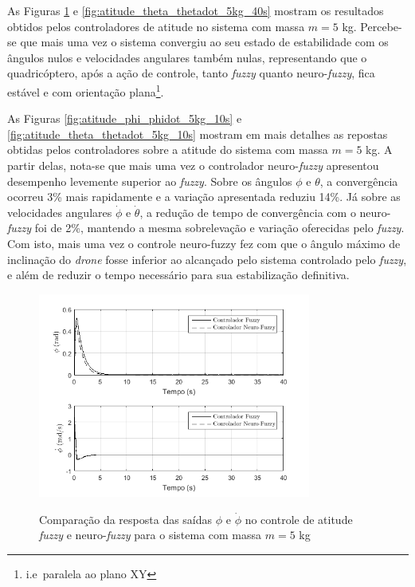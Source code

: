 
As Figuras \ref{fig:atitude_phi_phidot_5kg_40s} e \ref{fig:atitude_theta_thetadot_5kg_40s} mostram os resultados obtidos pelos controladores de atitude no sistema com massa $m=5$ kg. Percebe-se que mais uma vez o sistema convergiu ao seu estado de estabilidade com os ângulos nulos e velocidades angulares também nulas, representando que o quadricóptero, após a ação de controle, tanto \textit{fuzzy} quanto neuro-\textit{fuzzy}, fica estável e com orientação plana\footnote{i.e\ paralela ao plano XY}.

As Figuras \ref{fig:atitude_phi_phidot_5kg_10s} e \ref{fig:atitude_theta_thetadot_5kg_10s} mostram em mais detalhes as repostas obtidas pelos controladores sobre a atitude do sistema com massa $m=5$ kg. A partir delas, nota-se que mais uma vez o controlador neuro-\textit{fuzzy} apresentou desempenho levemente superior ao \textit{fuzzy}. Sobre os ângulos $\phi$ e $\theta$, a convergência ocorreu 3\% mais rapidamente e a variação apresentada reduziu 14\%. Já sobre as velocidades angulares $\dot{\phi}$ e $\dot{\theta}$, a redução de tempo de convergência com o neuro-\textit{fuzzy} foi de 2\%, mantendo a mesma sobrelevação e variação oferecidas pelo \textit{fuzzy}. Com isto, mais uma vez o controle neuro-fuzzy fez com que o ângulo máximo de inclinação do \textit{drone} fosse inferior ao alcançado pelo sistema controlado pelo \textit{fuzzy}, e além de reduzir o tempo necessário para sua estabilização definitiva.

\begin{figure}[!htb]
    \centering
    \caption{Comparação da resposta das saídas $\phi$ e $\dot{\phi}$ no controle de atitude \textit{fuzzy} e neuro-\textit{fuzzy} para o sistema com massa $m=5$ kg}
    \includegraphics[width=0.8\textwidth]{./04-figuras/resultados/novos/atitude_phi_phidot_5kg_40s}
    \label{fig:atitude_phi_phidot_5kg_40s}
\end{figure}

